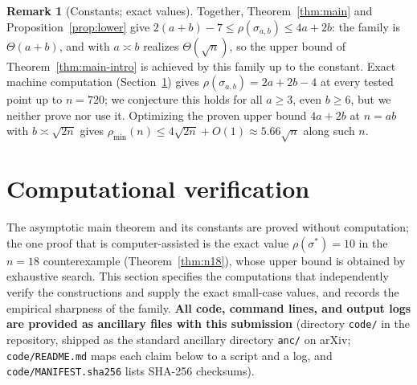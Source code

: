\documentclass[11pt]{article}
\theoremstyle{definition}
\newtheorem{remark}[theorem]{Remark}
\newcommand{\pmin}{\rho_{\min}}
\begin{document}
\begin{remark}[Constants; exact values]\label{rem:constants}
Together, Theorem~\ref{thm:main} and Proposition~\ref{prop:lower} give
$2(a+b) - 7 \le \rho(\sigma_{a,b}) \le 4a + 2b$: the family is $\Theta(a + b)$, and with
$a \asymp b$ realizes $\Theta(\sqrt n)$, so the upper bound of
Theorem~\ref{thm:main-intro} is achieved by this family up to the constant. Exact
machine computation (Section~\ref{sec:comp}) gives $\rho(\sigma_{a,b}) = 2a + 2b - 4$ at
every tested point up to $n = 720$; we conjecture this holds for all $a \ge 3$, even
$b \ge 6$, but we neither prove nor use it. Optimizing the proven upper bound $4a + 2b$
at $n = ab$ with $b \asymp \sqrt{2n}$ gives $\pmin(n) \le 4\sqrt{2n} + O(1) \approx
5.66\sqrt n$ along such $n$.
\end{remark}

\section{Computational verification}\label{sec:comp}

The asymptotic main theorem and its constants are proved without computation; the one
proof that is computer-assisted is the exact value $\rho(\sigma^\ast)=10$ in the $n=18$
counterexample (Theorem~\ref{thm:n18}), whose upper bound is obtained by exhaustive
search. This section specifies the computations that independently verify the
constructions and supply the exact small-case values, and records the empirical
sharpness of the family.
\textbf{All code, command lines, and output logs are provided as ancillary files with
this submission} (directory \texttt{code/} in the repository, shipped as the standard
ancillary directory \texttt{anc/} on arXiv; \texttt{code/README.md} maps each claim
below to a script and a log, and \texttt{code/MANIFEST.sha256} lists SHA-256 checksums).
\end{document}
